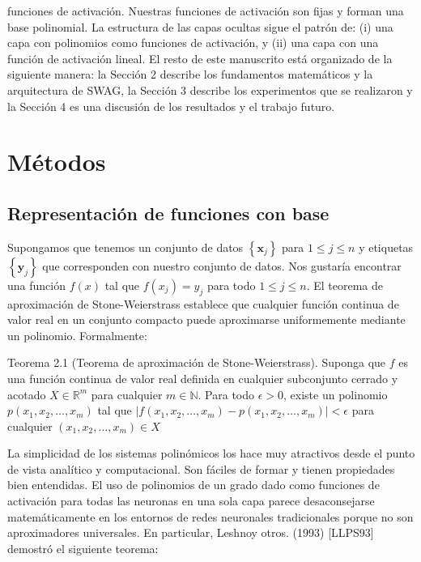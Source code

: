 \documentclass[10pt]{article}
\begin{document}
funciones de activación. Nuestras funciones de activación son fijas y forman una base polinomial. La estructura de las capas ocultas sigue el patrón de: (i) una capa con polinomios como funciones de activación, y (ii) una capa con una función de activación lineal. El resto de este manuscrito está organizado de la siguiente manera: la Sección 2 describe los fundamentos matemáticos y la arquitectura de SWAG, la Sección 3 describe los experimentos que se
realizaron y la Sección 4 es una discusión de los resultados y el trabajo futuro.

\section{Métodos}

\subsection{Representación de funciones con base}
Supongamos que tenemos un conjunto de datos $\left\{\mathbf{x}_{j}\right\}$ para $1 \leq j \leq n$ y etiquetas $\left\{\mathbf{y}_{j}\right\}$ que corresponden con nuestro conjunto de datos. Nos gustaría encontrar una función $f(x)$ tal que $f\left(x_{j}\right)=y_{j}$ para todo $1 \leq j \leq n$. El teorema de aproximación de Stone-Weierstrass establece que cualquier función continua de valor real en un conjunto compacto puede aproximarse uniformemente mediante un polinomio. Formalmente:

Teorema 2.1 (Teorema de aproximación de Stone-Weierstrass). Suponga que $f$ es una función continua de valor real definida en cualquier subconjunto cerrado y acotado $X \in \mathbb{R}^{m}$ para cualquier $m \in \mathbb{N}$. Para todo $\epsilon>0$, existe un polinomio $p\left(x_{1}, x_{2}, \ldots, x_{m}\right)$ tal que $\left|f\left(x_{1}, x_{2}, \ldots, x_{m}\right)-p\left(x_{1}, x_{2}, \ldots, x_{m}\right)\right|<\epsilon$ para cualquier $\left(x_{1}, x_{2}, \ldots, x_{m}\right) \in X$

La simplicidad de los sistemas polinómicos los hace muy atractivos desde el punto de vista analítico y computacional. Son fáciles de formar y tienen propiedades bien entendidas. El uso de polinomios de un grado dado como funciones de activación para todas las neuronas en una sola capa parece
desaconsejarse matemáticamente en los entornos de redes neuronales tradicionales porque no son aproximadores universales. En particular, Leshnoy otros. (1993) [LLPS93] demostró el siguiente teorema:
\end{document}
